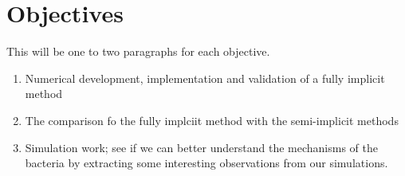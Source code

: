 \section{Objectives}

This will be one to two paragraphs for each objective.

\begin{enumerate}
  \item Numerical development, implementation and validation of a fully implicit method
  \item The comparison fo the fully implciit method with the semi-implicit methods
  \item Simulation work; see if we can better understand the mechanisms of the bacteria by extracting some interesting observations from our simulations.
\end{enumerate}
